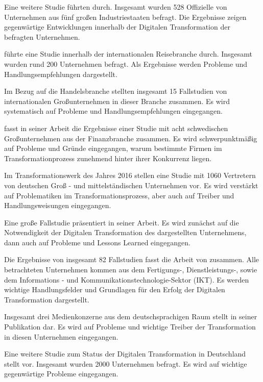 Eine weitere Studie führten  durch. Insgesamt wurden 528 Offizielle von Unternehmen aus fünf großen Industriestaaten befragt. Die Ergebnisse zeigen gegenwärtige Entwicklungen innerhalb der Digitalen Transformation der befragten Unternehmen.

 führte eine Studie innerhalb der internationalen Reisebranche durch. Insgesamt wurden rund 200 Unternehmen befragt. Als Ergebnisse werden Probleme und Handlungsempfehlungen dargestellt.

Im Bezug auf die Handelsbranche stellten  insgesamt 15 Fallstudien von internationalen Großunternehmen in dieser Branche zusammen. Es wird systematisch auf Probleme und Handlungsempfehlungen eingegangen.

 fasst in seiner Arbeit die Ergebnisse einer Studie mit acht schwedischen Großunternehmen aus der Finanzbranche zusammen. Es wird schwerpunktmäßig auf Probleme und Gründe eingegangen, warum bestimmte Firmen im Transformationprozess zunehmend hinter ihrer Konkurrenz liegen.

Im Transformationswerk des Jahres 2016 stellen  eine Studie mit 1060 Vertretern von deutschen Groß - und mittelständischen Unternehmen vor. Es wird  verstärkt auf Problematiken im Transformationsprozess, aber auch auf Treiber und Handlungsweisungen eingegangen.

Eine große Fallstudie präsentiert  in seiner Arbeit. Es wird zunächst auf die Notwendigkeit der Digitalen Transformation des dargestellten Unternehmens, dann auch auf Probleme und Lessons Learned eingegangen.

Die Ergebnisse von insgesamt 82 Fallstudien fasst die Arbeit von  zusammen. Alle betrachteten Unternehmen kommen aus dem Fertigungs-,  Dienstleistungs-,  sowie dem Informations - und Kommunikationstechnologie-Sektor (IKT). Es werden wichtige Handlungsfelder und Grundlagen für den Erfolg der Digitalen Transformation dargestellt.

Insgesamt drei Medienkonzerne aus dem deutschsprachigen Raum stellt  in seiner Publikation dar. Es wird auf Probleme  und wichtige Treiber der Transformation in diesen Unternehmen eingegangen.

Eine weitere Studie zum Status der Digitalen Transformation in Deutschland stellt  vor. Insgesamt wurden 2000 Unternehmen befragt. Es wird auf wichtige gegenwärtige Probleme eingegangen.

